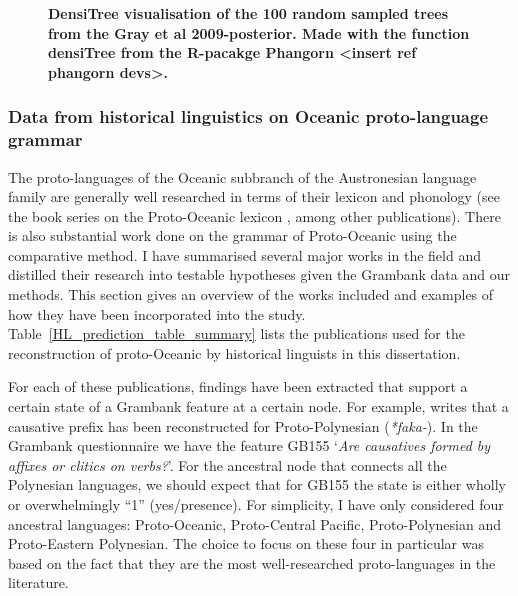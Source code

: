 \documentclass[a4paper,10pt]{article} %
\begin{document}
\begin{figure}[H]
\centering
\caption{\textbf{DensiTree \citep{bouckaert2014densitree} visualisation of the 100 random sampled trees from the Gray et al 2009-posterior. Made with the function densiTree from the R-pacakge Phangorn <insert ref phangorn devs>.}}
\label{densitree_plot}
\end{figure}

\subsubsection{Data from historical linguistics on Oceanic proto-language grammar}
\label{sec:POC_lit_review}

The proto-languages of the Oceanic subbranch of the Austronesian language family are generally well researched in terms of their lexicon and phonology (see the book series on the Proto-Oceanic lexicon \citep{protooceanicvol1, protooceanicvol2, protooceanicvol3, protooceanicvol4, protooceanicvol5}, among other publications). There is also substantial work done on the grammar of Proto-Oceanic using the comparative method. I have summarised several major works in the field and distilled their research into testable hypotheses given the Grambank data and our methods. This section gives an overview of the works included and examples of how they have been incorporated into the study. Table~\ref{HL_prediction_table_summary} lists the publications used for the reconstruction of proto-Oceanic by historical linguists in this dissertation. 

For each of these publications, findings have been extracted that support a certain state of a Grambank feature at a certain node. For example, \citet[4]{marck2000_encyclo} writes that a causative prefix has been reconstructed for Proto-Polynesian (\emph{*faka-}). In the Grambank questionnaire we have the feature GB155 `\emph{Are causatives formed by affixes or clitics on verbs?}'. For the ancestral node that connects all the Polynesian languages, we should expect that for GB155 the state is either wholly or overwhelmingly ``1'' (yes/presence). For simplicity, I have only considered four ancestral languages: Proto-Oceanic, Proto-Central Pacific, Proto-Polynesian and Proto-Eastern Polynesian. The choice to focus on these four in particular was based on the fact that they are the most well-researched proto-languages in the literature. 
\end{document}
